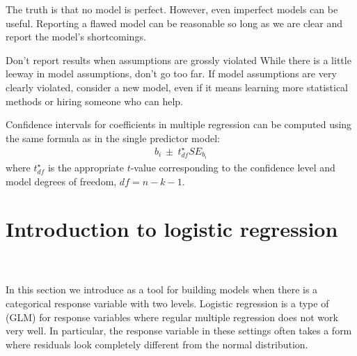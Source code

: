 \begin{tipBox}{
The truth is that no model is perfect. However, even imperfect models can be useful. Reporting a flawed model can be reasonable so long as we are clear and report the model's shortcomings.}
\end{tipBox}

\begin{caution}
{Don't report results when assumptions are grossly violated}
{While there is a little leeway in model assumptions, don't go too far. If model assumptions are very clearly violated, consider a new model, even if it means learning more statistical methods or hiring someone who can help.}
\end{caution}

\begin{tipBox}{
Confidence intervals for coefficients in multiple regression can be computed using the same formula as in the single predictor model:
\begin{align*}
b_i \ \pm\ t_{df}^{\star}SE_{b_{i}}
\end{align*}
where $t_{df}^{\star}$ is the appropriate $t$-value corresponding to the confidence level and model degrees of freedom, $df=n-k-1$.}
\end{tipBox}


\section[Introduction to logistic regression]{Introduction to logistic regression ~}
\label{logisticRegression}


In this section we introduce  as a tool for building models when there is a categorical response variable with two levels. Logistic regression is a type of  (GLM) for response variables where regular multiple regression does not work very well. In particular, the response variable in these settings often takes a form where residuals look completely different from the normal distribution.

